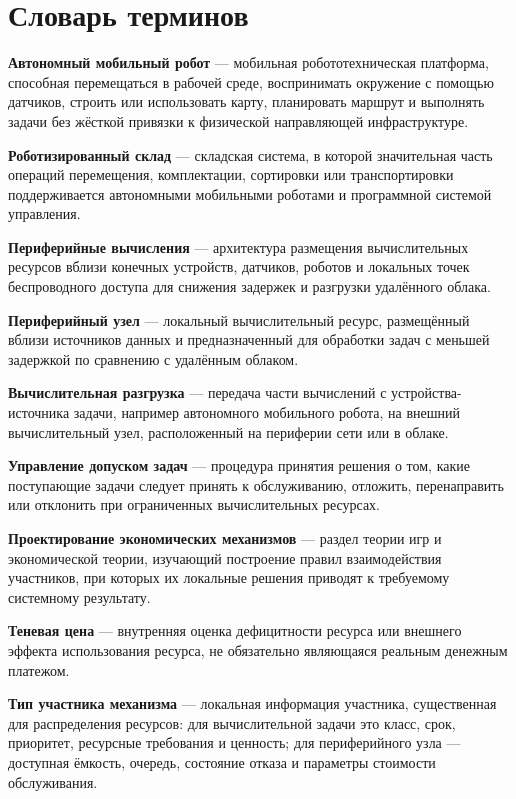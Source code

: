 \chapter*{Словарь терминов}             %

\textbf{Автономный мобильный робот} --- мобильная робототехническая платформа, способная перемещаться в рабочей среде, воспринимать окружение с помощью датчиков, строить или использовать карту, планировать маршрут и выполнять задачи без жёсткой привязки к физической направляющей инфраструктуре.

\textbf{Роботизированный склад} --- складская система, в которой значительная часть операций перемещения, комплектации, сортировки или транспортировки поддерживается автономными мобильными роботами и программной системой управления.

\textbf{Периферийные вычисления} --- архитектура размещения вычислительных ресурсов вблизи конечных устройств, датчиков, роботов и локальных точек беспроводного доступа для снижения задержек и разгрузки удалённого облака.

\textbf{Периферийный узел} --- локальный вычислительный ресурс, размещённый вблизи источников данных и предназначенный для обработки задач с меньшей задержкой по сравнению с удалённым облаком.

\textbf{Вычислительная разгрузка} --- передача части вычислений с устройства-источника задачи, например автономного мобильного робота, на внешний вычислительный узел, расположенный на периферии сети или в облаке.

\textbf{Управление допуском задач} --- процедура принятия решения о том, какие поступающие задачи следует принять к обслуживанию, отложить, перенаправить или отклонить при ограниченных вычислительных ресурсах.

\textbf{Проектирование экономических механизмов} --- раздел теории игр и экономической теории, изучающий построение правил взаимодействия участников, при которых их локальные решения приводят к требуемому системному результату.

\textbf{Теневая цена} --- внутренняя оценка дефицитности ресурса или внешнего эффекта использования ресурса, не обязательно являющаяся реальным денежным платежом.

\textbf{Тип участника механизма} --- локальная информация участника, существенная для распределения ресурсов: для вычислительной задачи это класс, срок, приоритет, ресурсные требования и ценность; для периферийного узла --- доступная ёмкость, очередь, состояние отказа и параметры стоимости обслуживания.

